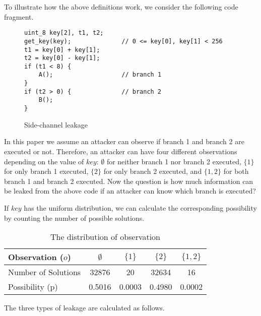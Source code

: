 To illustrate how the above definitions work, we consider the following code
fragment.

\begin{figure}[h!]
    \centering
    \begin{lstlisting}[xleftmargin=.03\textwidth,xrightmargin=.01\textwidth]
uint_8 key[2], t1, t2;
get_key(key);              // 0 <= key[0], key[1] < 256
t1 = key[0] + key[1];
t2 = key[0] - key[1];
if (t1 < 8) {
    A();                   // branch 1
}
if (t2 > 0) {              // branch 2
    B();
}
\end{lstlisting}
    \caption{Side-channel leakage}
    \label{background::side-channel}
\end{figure}
In this paper we assume an attacker can observe if branch 1 and branch 2 are
executed or not. Therefore, an attacker can have four different observations
depending on the value of $\mathit{key}$: $\emptyset$ for neither branch 1 nor
branch 2 executed, $\{1\}$ for only branch 1 executed, $\{2\}$ for only branch 2
executed, and $\{1, 2\}$ for both branch 1 and branch 2 executed. Now the
question is how much information can be leaked from the above code if an
attacker can know which branch is executed?

If $key$ has the uniform distribution, we can calculate the corresponding
possibility by counting the number of possible solutions.
\begin{table}[ht]
    \centering
    \caption{The distribution of observation}\label{shtable}
    \begin{tabular}{l|cccc}
        \hline
        Observation ($o$)   & $\emptyset$ & ${\{1\}}$ & ${\{2\}}$ & ${\{1, 2\}}$ \\ \hline
        Number of Solutions & 32876       & 20        & 32634     & 16           \\ \hline
        Possibility (p)     & 0.5016      & 0.0003    & 0.4980    & 0.0002       \\
        \hline
    \end{tabular}
\end{table}


The three types of leakage are calculated as follows.


